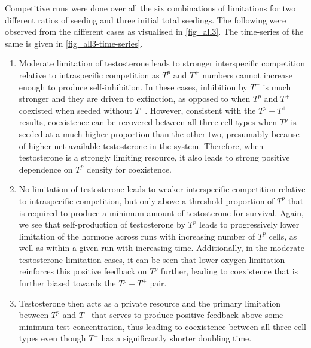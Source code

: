 Competitive runs were done over all the six combinations of limitations for two different ratios of seeding and three initial total seedings. The following were observed from the different cases as visualised in \autoref{fig_all3}. The time-series of the same is given in \autoref{fig_all3-time-series}.
\begin{enumerate}
  \item Moderate limitation of testosterone leads to  stronger interspecific competition relative to intraspecific competition as $T^p$ and $T^+$ numbers cannot increase enough to produce self-inhibition. In these cases, inhibition by $T^-$ is much stronger and they are driven to extinction, as opposed to when $T^p$ and $T^+$ coexisted when seeded without $T^-$. However, consistent with the $T^p - T^+$ results, coexistence can be recovered between all three cell types when $T^p$ is seeded at a much higher proportion than the other two, presumably because of higher net available testosterone in the system. Therefore, when testosterone is a strongly limiting resource, it also leads to strong positive dependence on $T^p$ density for coexistence.
  \item No limitation of testosterone leads to weaker interspecific competition relative to intraspecific competition, but only above a threshold proportion of $T^p$ that is required to produce a minimum amount of testosterone for survival. Again, we see that self-production of testosterone by $T^p$ leads to progressively lower limitation of the hormone across runs with increasing number of $T^p$ cells, as well as within a given run with increasing time. Additionally, in the moderate testosterone limitation cases, it can be seen that lower oxygen limitation reinforces this positive feedback on $T^p$ further, leading to coexistence that is further biased towards the $T^p - T^+$ pair.
  \item Testosterone then acts as a private resource and the primary limitation between $T^p$ and $T^+$ that serves to produce positive feedback above some minimum test concentration, thus leading to coexistence between all three cell types even though $T^-$ has a significantly shorter doubling time.
\end{enumerate}
